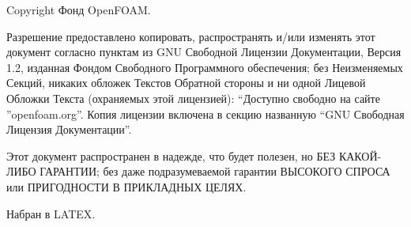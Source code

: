 
Copyright  Фонд OpenFOAM.

Разрешение предоставлено копировать, распространять и/или изменять этот документ согласно пунктам из GNU
 Свободной Лицензии Документации, Версия 1.2, изданная Фондом Свободного Программного обеспечения; без Неизменяемых Секций,
 никаких обложек Текстов Обратной стороны и ни одной Лицевой Обложки Текста (охраняемых этой лицензией):
“Доступно свободно на сайте ”openfoam.org”. Копия лицензии включена в секцию названную “GNU Свободная Лицензия Документации”.

Этот документ распространен в надежде, что будет полезен, но БЕЗ КАКОЙ-ЛИБО ГАРАНТИИ; без даже подразумеваемой гарантии
 ВЫСОКОГО СПРОСА или ПРИГОДНОСТИ В ПРИКЛАДНЫХ ЦЕЛЯХ.

Набран в LATEX.